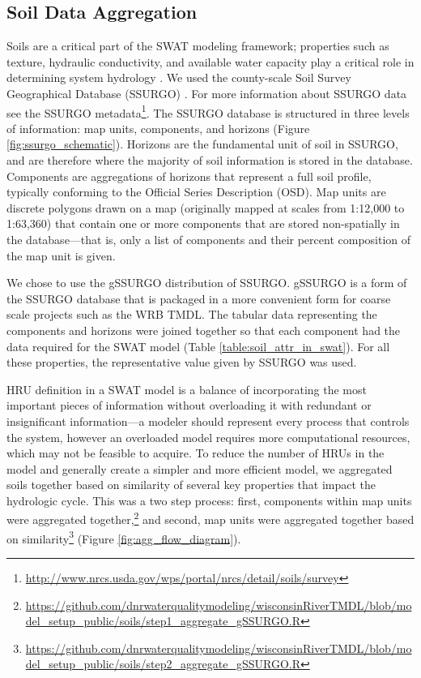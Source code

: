 \subsection{Soil Data Aggregation}\label{sec:soils}

Soils are a critical part of the SWAT modeling framework; properties such as
texture, hydraulic conductivity, and available water capacity play a critical
role in determining system hydrology . We used the county-scale Soil Survey
Geographical Database (SSURGO) . For more
information about SSURGO data see the SSURGO
metadata\footnote{\url{http://www.nrcs.usda.gov/wps/portal/nrcs/detail/soils/survey}}.
The SSURGO database is structured in three levels of information: map units,
components, and horizons (Figure \ref{fig:ssurgo_schematic}). Horizons are the
fundamental unit of soil in SSURGO, and are therefore where the majority of soil
information is stored in the database.
Components are aggregations of horizons that represent a full soil profile,
typically conforming to the Official Series Description (OSD). Map units are
discrete polygons drawn on a map (originally mapped at scales from 1:12,000 to
1:63,360) that contain one or more components that are stored non-spatially in
the database---that is, only a list of components and their percent composition
of the map unit is given.

We chose to use the gSSURGO distribution of SSURGO. gSSURGO is a form of the
SSURGO database that is packaged in a more convenient form for coarse scale
projects such as the WRB TMDL. The tabular data representing the components and
horizons were joined together so that each component had the data required for
the SWAT model (Table \ref{table:soil_attr_in_swat}). For all these properties,
the representative value given by SSURGO was used.

HRU definition in a SWAT model is a balance of incorporating the most important
pieces of information without overloading it with redundant or insignificant
information---a modeler should represent every process that controls the system,
however an overloaded model requires more computational resources, which may not
be feasible to acquire. To reduce the number of HRUs in the model and generally
create a simpler and more efficient model, we aggregated soils together based on
similarity of several key properties that impact the hydrologic cycle. This was
a two step process: first, components within map units were aggregated
together,\footnote{\url{https://github.com/dnrwaterqualitymodeling/wisconsinRiverTMDL/blob/model_setup_public/soils/step1_aggregate_gSSURGO.R}
} and second, map units were aggregated together based on
similarity\footnote{\url{https://github.com/dnrwaterqualitymodeling/wisconsinRiverTMDL/blob/model_setup_public/soils/step2_aggregate_gSSURGO.R}}
(Figure \ref{fig:agg_flow_diagram}).

